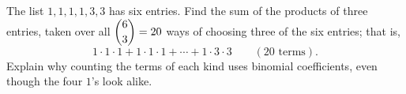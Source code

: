 The list $1,1,1,1,3,3$ has six entries. Find the sum of the products of three entries, taken over all $\dbinom63=20$ ways of choosing three of the six entries; that is,
\[1\cdot1\cdot1+1\cdot1\cdot1+\cdots+1\cdot3\cdot3\qquad(20\text{ terms}).\]
Explain why counting the terms of each kind uses binomial coefficients, even though the four $1$'s look alike.
